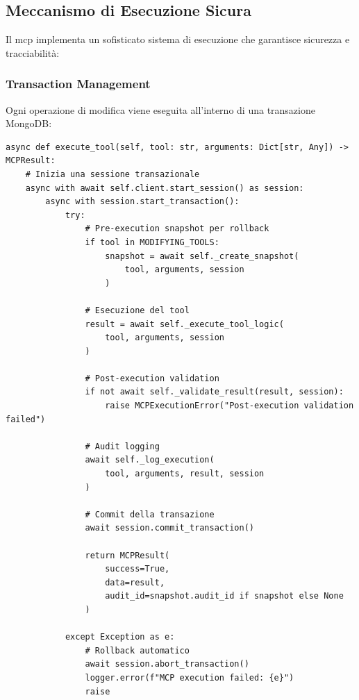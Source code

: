 \subsection{Meccanismo di Esecuzione Sicura}
\label{subsec:mcp_secure_execution}

Il \gls{mcp} implementa un sofisticato sistema di esecuzione che garantisce sicurezza e tracciabilità:

\subsubsection{Transaction Management}
Ogni operazione di modifica viene eseguita all'interno di una transazione MongoDB:

\begin{listing}[H]
\begin{verbatim}
async def execute_tool(self, tool: str, arguments: Dict[str, Any]) -> MCPResult:
    # Inizia una sessione transazionale
    async with await self.client.start_session() as session:
        async with session.start_transaction():
            try:
                # Pre-execution snapshot per rollback
                if tool in MODIFYING_TOOLS:
                    snapshot = await self._create_snapshot(
                        tool, arguments, session
                    )
                
                # Esecuzione del tool
                result = await self._execute_tool_logic(
                    tool, arguments, session
                )
                
                # Post-execution validation
                if not await self._validate_result(result, session):
                    raise MCPExecutionError("Post-execution validation failed")
                
                # Audit logging
                await self._log_execution(
                    tool, arguments, result, session
                )
                
                # Commit della transazione
                await session.commit_transaction()
                
                return MCPResult(
                    success=True,
                    data=result,
                    audit_id=snapshot.audit_id if snapshot else None
                )
                
            except Exception as e:
                # Rollback automatico
                await session.abort_transaction()
                logger.error(f"MCP execution failed: {e}")
                raise
\end{verbatim}
\caption{Gestione transazionale delle operazioni MCP}
\label{listing:mcp-transaction}
\end{listing}

